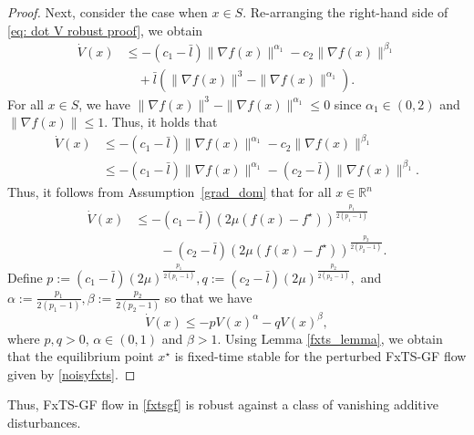 \documentclass[letterpaper]{article}
\begin{document}
\begin{proof}
Next, consider the case when $x\in S$. Re-arranging the right-hand side of \eqref{eq: dot V robust proof}, we obtain
\begin{align*}
\dot{V}(x) &\leq -(c_1 -\bar{l})\|\nabla f(x)\|^{\alpha_1} -c_2\|\nabla f(x)\|^{\beta_1} \\ &\quad
+\bar{l}\left(\|\nabla f(x)\|^3 - \|\nabla f(x)\|^{\alpha_1} \right).
\end{align*}
For all $x\in S$, we have $\|\nabla f(x)\|^3 - \|\nabla f(x)\|^{\alpha_1} \leq 0$ since $\alpha_1 \in (0,2)$ and $\|\nabla f(x)\|\leq 1$. Thus, it holds that
\begin{align*}
\dot{V}(x) &\leq -(c_1 -\bar{l})\|\nabla f(x)\|^{\alpha_1} -c_2\|\nabla f(x)\|^{\beta_1} \\
&\leq -(c_1 -\bar{l})\|\nabla f(x)\|^{\alpha_1} -(c_2-\bar{l})\|\nabla f(x)\|^{\beta_1}.
\end{align*}
Thus, it follows from Assumption~\ref{grad_dom} that for all $x\in \mathbb R^n$
\begin{align*}
\dot{V}(x) &\leq -(c_1-\bar{l})(2\mu(f(x)-f^\star))^{\frac{p_1}{2(p_1-1)}} \\
&\qquad -(c_2-\bar{l})(2\mu(f(x)-f^\star))^{\frac{p_2}{2(p_2-1)}}.
\end{align*}
Define $p := (c_1-\bar{l}) (2\mu)^{\frac{p_1}{2(p_1-1)}}, q := (c_2-\bar{l}) (2\mu)^{\frac{p_2}{2(p_2-1)}},$ and $\alpha:= \frac{p_1}{2(p_1-1)}, \beta:=\frac{p_2}{2(p_2-1)}$ so that we have
\[\dot{V}(x) \leq -p V(x)^{\alpha}-q V(x)^{\beta},\]
where $p,q>0$, $\alpha \in (0,1)$ and $\beta>1$. Using Lemma \ref{fxts_lemma}, we obtain that the equilibrium point $x^\star$ is fixed-time stable for the perturbed FxTS-GF flow given by \eqref{noisyfxts}.
\end{proof}

Thus, FxTS-GF flow in \eqref{fxtsgf} is robust against a class of vanishing additive disturbances.
\end{document}
